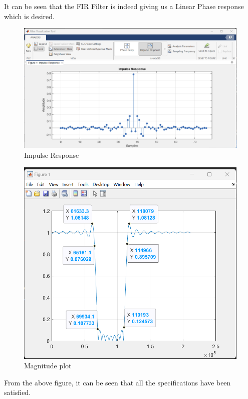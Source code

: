 \documentclass{article}
\begin{document}
It can be seen that the FIR Filter is indeed giving us a Linear Phase response which is
desired.

\clearpage

\begin{figure}[h!]

\centering
\includegraphics[scale = 0.45]{Impulse Response_Bandstop.png}
\caption{Impulse Response}
\end{figure}

\begin{figure}[h!]

\centering
\includegraphics[scale = 0.58]{Bandstop_Freq.png}
\caption{Magnitude plot}
\end{figure}

From the above figure, it can be seen that all the specifications have been satisfied.
\end{document}
